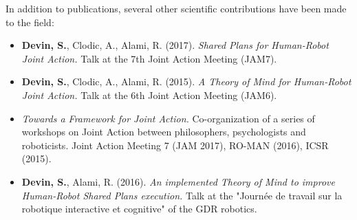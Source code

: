 \documentclass[english,a4paper,11pt,twoside]{StyleThese}
\begin{document}
In addition to publications, several other scientific contributions have been made to the field:
\begin{itemize}
\item \textbf{Devin, S.}, Clodic, A., Alami, R. (2017). \textit{Shared Plans for Human-Robot Joint Action.} Talk at the 7th Joint Action Meeting (JAM7).
\item \textbf{Devin, S.}, Clodic, A., Alami, R. (2015). \textit{A Theory of Mind for Human-Robot Joint Action.} Talk at the 6th Joint Action Meeting (JAM6).
\item \textit{Towards a Framework for Joint Action.} Co-organization of a series of workshops on Joint Action between philosophers, psychologists and roboticists. Joint Action Meeting 7 (JAM 2017), RO-MAN (2016), ICSR (2015).
\item \textbf{Devin, S.}, Alami, R. (2016). \textit{An implemented Theory of Mind to improve Human-Robot Shared Plans execution.} Talk at the "Journée de travail sur la robotique interactive et cognitive" of the GDR robotics.
\end{itemize}

\ifdefined{}
\else


\end{document}
